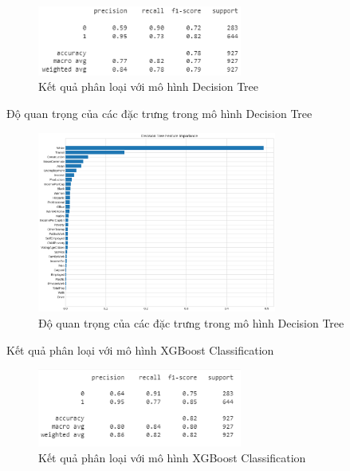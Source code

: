 \documentclass[10pt]{beamer}
\theoremstyle{remark}
\theoremstyle{definition}
\begin{document}
\begin{frame}
	\begin{figure}[h!]
        \centering
        \includegraphics[width=0.6\textwidth]{figures/Decision_Tree_Report.png}
        \caption{Kết quả phân loại với mô hình Decision Tree}
    \end{figure}
\end{frame}

\begin{frame}{Độ quan trọng của các đặc trưng trong mô hình Decision Tree}
	\begin{figure}[h!]
        \centering
        \includegraphics[width=0.7\textwidth]{figures/Decision_Tree_Feature_Importance.png}
        \caption{Độ quan trọng của các đặc trưng trong mô hình Decision Tree}
    \end{figure}
\end{frame}

\begin{frame}{Kết quả phân loại với mô hình XGBoost Classification}
	\begin{figure}[h!]
        \centering
        \includegraphics[width=0.6\textwidth]{figures/XGBoost_Classifier_Report.png}
        \caption{Kết quả phân loại với mô hình XGBoost Classification}
    \end{figure}
\end{frame}
\end{document}
